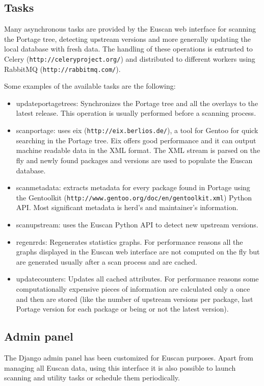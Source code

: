 \subsection{Tasks}
Many asynchronous tasks are provided by the Euscan web interface for scanning the Portage tree, detecting upstream versions and more generally updating the local database with fresh data.
The handling of these operations is entrusted to Celery (\texttt{http://celeryproject.org/}) and distributed to different workers using RabbitMQ (\texttt{http://rabbitmq.com/}).

Some examples of the available tasks are the following:
\begin{itemize}
\item update\textunderscore portage\textunderscore trees: Synchronizes the Portage tree and all the overlays to the latest release. This operation is usually performed before a scanning process.
\item scan\textunderscore portage: uses eix (\texttt{http://eix.berlios.de/}), a tool for Gentoo for quick searching in the Portage tree. Eix offers good performance and it can output machine readable data in the XML format. The XML stream is parsed on the fly and newly found packages and versions are used to populate the Euscan database.
\item scan\textunderscore metadata: extracts metadata for every package found in Portage using the Gentoolkit (\texttt{http://www.gentoo.org/doc/en/gentoolkit.xml}) Python API. Most significant metadata is herd's and maintainer's information.
\item scan\textunderscore upstream: uses the Euscan Python API to detect new upstream versions. 
\item regen\textunderscore rrds: Regenerates statistics graphs. For performance reasons all the graphs displayed in the Euscan web interface are not computed on the fly but are generated usually after a scan process and are cached.
\item update\textunderscore counters: Updates all cached attributes. For performance reasons some computationally expensive pieces of information are calculated only a once and then are stored (like the number of upstream versions per package, last Portage version for each package or being or not the latest version).
\end{itemize}


\subsection{Admin panel}
The Django admin panel has been customized for Euscan purposes. Apart from managing all Euscan data, using this interface it is also possible to launch scanning and utility tasks or schedule them periodically.


